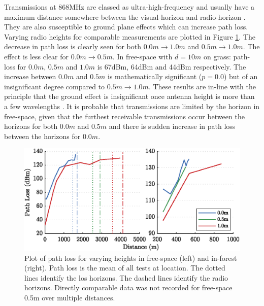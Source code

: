 Transmissions at 868MHz are classed as ultra-high-frequency and usually have a maximum distance somewhere between the visual-horizon and radio-horizon \cite{3YP:ANTENNA_BOOK}. They are also susceptible to ground plane effects which can increase path loss. Varying radio heights for comparable measurements are plotted in Figure \ref{fig:height_pl_plot}. The decrease in path loss is clearly seen for both $0.0m\rightarrow 1.0m $ and $0.5m\rightarrow 1.0m$. The effect is less clear for $0.0m\rightarrow 0.5m$. In free-space with $d=10m$ on grass: path-loss for $0.0m$, $0.5m$ and $1.0m$ is 67dBm, 64dBm and 44dBm respectively. The increase between $0.0m$ and $0.5m$ is mathematically significant ($p=0.0$) but of an insignificant degree compared to $0.5m\rightarrow 1.0m$. These results are in-line with the principle that the ground effect is insignificant once antenna height is more than a few wavelengths \cite{3YP:ANTENNA_BOOK}. It is probable that transmissions are limited by the horizon in free-space, given that the furthest receivable transmissions occur between the horizons for both $0.0m$ and $0.5m$ and there is sudden increase in path loss between the horizons for $0.0m$.

\begin{figure}[H]
    \centering
   	\includegraphics{Figures/height_pl_plot}
    \caption[Effect of Antenna Height on Path Loss]{
		Plot of path loss for varying heights in free-space (left) and in-forest (right). Path loss is the mean of all tests at location. The dotted lines identify the \ac{los} horizons. The dashed lines identify the radio horizons. Directly comparable data was not recorded for free-space 0.5m over multiple distances.
    }
    \label{fig:height_pl_plot}
\end{figure}